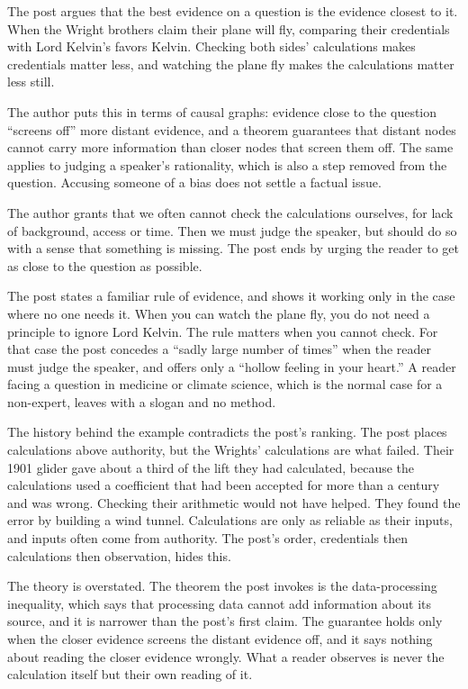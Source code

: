 \begin{afterword}
\summaryhead

The post argues that the best evidence on a question is the evidence closest to it. When the Wright brothers claim their plane will fly, comparing their credentials with Lord Kelvin's favors Kelvin. Checking both sides' calculations makes credentials matter less, and watching the plane fly makes the calculations matter less still.

The author puts this in terms of causal graphs: evidence close to the question ``screens off'' more distant evidence, and a theorem guarantees that distant nodes cannot carry more information than closer nodes that screen them off. The same applies to judging a speaker's rationality, which is also a step removed from the question. Accusing someone of a bias does not settle a factual issue.

The author grants that we often cannot check the calculations ourselves, for lack of background, access or time. Then we must judge the speaker, but should do so with a sense that something is missing. The post ends by urging the reader to get as close to the question as possible.

\responsehead

The post states a familiar rule of evidence, and shows it working only in the case where no one needs it. When you can watch the plane fly, you do not need a principle to ignore Lord Kelvin. The rule matters when you cannot check. For that case the post concedes a ``sadly large number of times'' when the reader must judge the speaker, and offers only a ``hollow feeling in your heart.'' A reader facing a question in medicine or climate science, which is the normal case for a non-expert, leaves with a slogan and no method.

The history behind the example contradicts the post's ranking. The post places calculations above authority, but the Wrights' calculations are what failed. Their 1901 glider gave about a third of the lift they had calculated, because the calculations used a coefficient that had been accepted for more than a century and was wrong. Checking their arithmetic would not have helped. They found the error by building a wind tunnel. Calculations are only as reliable as their inputs, and inputs often come from authority. The post's order, credentials then calculations then observation, hides this.

The theory is overstated. The theorem the post invokes is the data-processing inequality, which says that processing data cannot add information about its source, and it is narrower than the post's first claim. The guarantee holds only when the closer evidence screens the distant evidence off, and it says nothing about reading the closer evidence wrongly. What a reader observes is never the calculation itself but their own reading of it.


\end{afterword}
